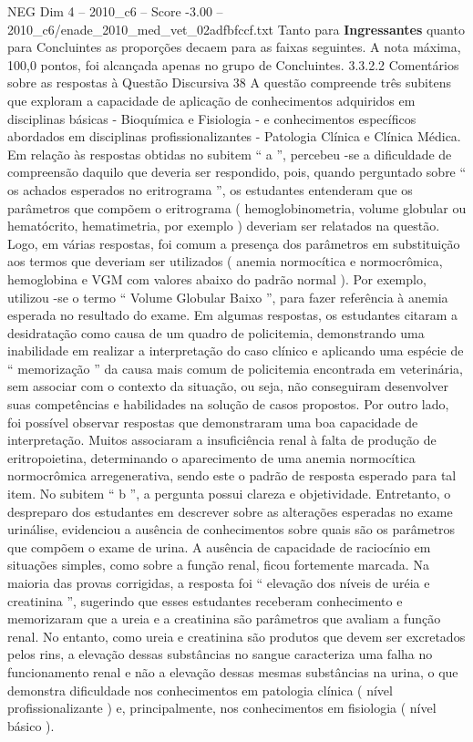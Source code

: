 \begin{textsample}{NEG Dim 4 – 2010\_c6 – Score -3.00 – 2010\_c6/enade\_2010\_med\_vet\_02adfbfccf.txt}
Tanto para \textbf{Ingressantes} quanto para Concluintes as proporções decaem para as faixas seguintes.
A nota máxima, 100,0 pontos, foi alcançada apenas no grupo de Concluintes. 3.3.2.2 Comentários sobre as respostas à Questão Discursiva 38 A questão compreende três subitens que exploram a capacidade de aplicação de conhecimentos adquiridos em disciplinas básicas - Bioquímica e Fisiologia - e conhecimentos específicos abordados em disciplinas profissionalizantes - Patologia Clínica e Clínica Médica.
Em relação às respostas obtidas no subitem “ a ”, percebeu -se a dificuldade de compreensão daquilo que deveria ser respondido, pois, quando perguntado sobre “ os achados esperados no eritrograma ”, os estudantes entenderam que os parâmetros que compõem o eritrograma ( hemoglobinometria, volume globular ou hematócrito, hematimetria, por exemplo ) deveriam ser relatados na questão.
Logo, em várias respostas, foi comum a presença dos parâmetros em substituição aos termos que deveriam ser utilizados ( anemia normocítica e normocrômica, hemoglobina e VGM com valores abaixo do padrão normal ).
Por exemplo, utilizou -se o termo “ Volume Globular Baixo ”, para fazer referência à anemia esperada no resultado do exame.
Em algumas respostas, os estudantes citaram a desidratação como causa de um quadro de policitemia, demonstrando uma inabilidade em realizar a interpretação do caso clínico e aplicando uma espécie de “ memorização ” da causa mais comum de policitemia encontrada em veterinária, sem associar com o contexto da situação, ou seja, não conseguiram desenvolver suas competências e habilidades na solução de casos propostos.
Por outro lado, foi possível observar respostas que demonstraram uma boa capacidade de interpretação.
Muitos associaram a insuficiência renal à falta de produção de eritropoietina, determinando o aparecimento de uma anemia normocítica normocrômica arregenerativa, sendo este o padrão de resposta esperado para tal item.
No subitem “ b ”, a pergunta possui clareza e objetividade.
Entretanto, o despreparo dos estudantes em descrever sobre as alterações esperadas no exame urinálise, evidenciou a ausência de conhecimentos sobre quais são os parâmetros que compõem o exame de urina.
A ausência de capacidade de raciocínio em situações simples, como sobre a função renal, ficou fortemente marcada.
Na maioria das provas corrigidas, a resposta foi “ elevação dos níveis de uréia e creatinina ”, sugerindo que esses estudantes receberam conhecimento e memorizaram que a ureia e a creatinina são parâmetros que avaliam a função renal.
No entanto, como ureia e creatinina são produtos que devem ser excretados pelos rins, a elevação dessas substâncias no sangue caracteriza uma falha no funcionamento renal e não a elevação dessas mesmas substâncias na urina, o que demonstra dificuldade nos conhecimentos em patologia clínica ( nível profissionalizante ) e, principalmente, nos conhecimentos em fisiologia ( nível básico ).

\end{textsample}
